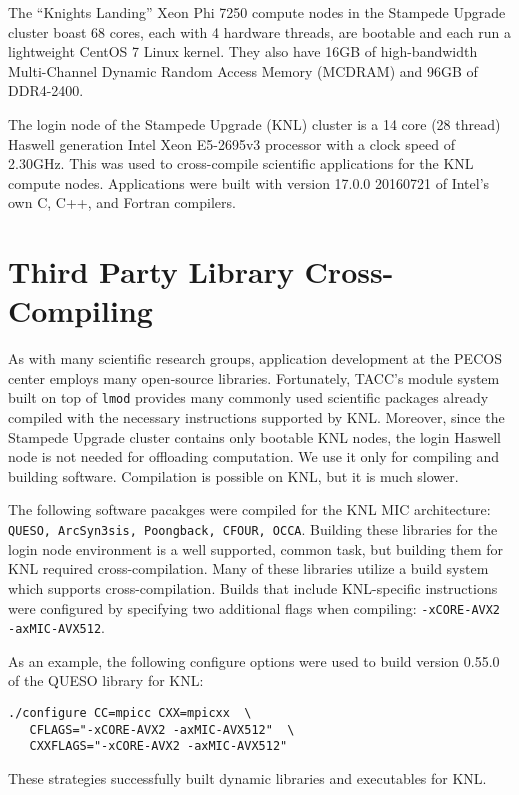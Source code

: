 The ``Knights Landing'' Xeon Phi 7250 compute nodes in the Stampede Upgrade
cluster boast 68 cores, each with 4 hardware threads, are bootable and each run
a lightweight CentOS 7 Linux kernel.  They also have 16GB of high-bandwidth
Multi-Channel Dynamic Random Access Memory (MCDRAM) and 96GB of DDR4-2400.

The login node of the Stampede Upgrade (KNL) cluster is a 14 core (28 thread)
Haswell generation Intel Xeon E5-2695v3 processor with a clock speed of
2.30GHz.  This was used to cross-compile scientific applications for the KNL
compute nodes.  Applications were built with version 17.0.0 20160721 of Intel's
own C, C++, and Fortran compilers.

\section{Third Party Library Cross-Compiling}
\label{sec:cross_compile}

As with many scientific research groups, application development at the PECOS
center employs many open-source libraries.  Fortunately, TACC's module system
built on top of \texttt{lmod} provides many commonly used scientific packages
already compiled with the necessary instructions supported by KNL.  Moreover,
since the Stampede Upgrade cluster contains only bootable KNL nodes, the login
Haswell node is not needed for offloading computation.  We use it only for
compiling and building software.  Compilation is possible on KNL, but it is
much slower.

The following software pacakges were compiled for the KNL MIC architecture:
\texttt{QUESO, ArcSyn3sis, Poongback, CFOUR, OCCA}.  Building these libraries
for the login node environment is a well supported, common task, but building
them for KNL required cross-compilation.  Many of these libraries utilize a
build system which supports cross-compilation.  Builds that include
KNL-specific instructions were configured by specifying two additional flags
when compiling: \texttt{-xCORE-AVX2 -axMIC-AVX512}.

As an example, the following configure options were used to build version
0.55.0 of the QUESO library for KNL:

{\small
\begin{verbatim}
./configure CC=mpicc CXX=mpicxx  \
   CFLAGS="-xCORE-AVX2 -axMIC-AVX512"  \
   CXXFLAGS="-xCORE-AVX2 -axMIC-AVX512"
\end{verbatim}
}

These strategies successfully built dynamic libraries and executables for KNL.
